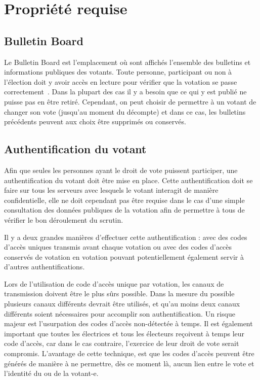\documentclass[../report]{subfiles}
\begin{document}
\chapter{Propriété requise}
\section{Bulletin Board}

Le Bulletin Board est l'emplacement où sont affichés l'ensemble des bulletins et informations publiques des votants. 
Toute personne, participant ou non à l'élection doit y avoir accès en lecture pour vérifier que la votation se passe correctement~\cite{gharadaghy_verifiability_2010}.
Dans la plupart des cas il y a besoin que ce qui y est publié ne puisse pas en être retiré.
Cependant, on peut choisir de permettre à un votant de changer son vote (jusqu'au moment du décompte) et dans ce cas, les bulletins précédents 
peuvent aux choix être supprimés ou conservés.

\section{Authentification du votant}

Afin que seules les personnes ayant le droit de vote puissent participer, une authentification du votant doit être mise en place.
Cette authentification doit se faire sur tous les serveurs avec lesquels le votant interagit de manière confidentielle, elle ne doit
cependant pas être requise dans le cas d'une simple consultation des données publiques de la votation afin de permettre à tous de vérifier
le bon déroulement du scrutin.

Il y a deux grandes manières d'effectuer cette authentification : avec des codes d'accès uniques transmis avant chaque votation ou avec des codes d'accès
conservés de votation en votation pouvant potentiellement également servir à d'autres authentifications.

Lors de l'utilisation de code d'accès unique par votation, les canaux de transmission doivent être le plus sûrs possible.
Dans la mesure du possible plusieurs canaux différents devrait être utilisés, et qu'au moins deux canaux différents soient nécessaires pour accomplir son authentification.
Un risque majeur est l'usurpation des codes d'accès non-détectée à temps.
Il est également important que toutes les électrices et tous les électeurs reçoivent à temps leur code d'accès, car dans le cas contraire, l'exercice de leur droit de vote serait compromis.
L'avantage de cette technique, est que les codes d'accès peuvent être générés de manière à ne permettre, dès ce moment là, aucun lien entre le vote
et l'identité du ou de la votant-e.
\end{document}
